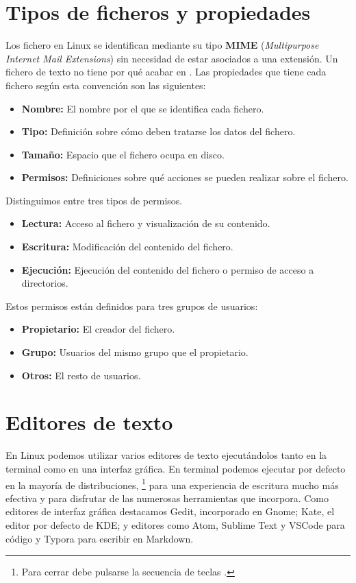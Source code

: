 \section{Tipos de ficheros y propiedades}

Los fichero en Linux se identifican mediante su tipo \textbf{MIME} (\textit{Multipurpose Internet Mail Extensions}) sin necesidad de estar asociados a una extensión.
Un fichero de texto no tiene por qué acabar en .
Las propiedades que tiene cada fichero según esta convención son las siguientes:

\begin{itemize}
	\item\textbf{Nombre:} El nombre por el que se identifica cada fichero.
	\item\textbf{Tipo:} Definición sobre cómo deben tratarse los datos del fichero.
	\item\textbf{Tamaño:} Espacio que el fichero ocupa en disco.
	\item\textbf{Permisos:} Definiciones sobre qué acciones se pueden realizar sobre el fichero.
\end{itemize}

Distinguimos entre tres tipos de permisos.

\begin{itemize}
	\item\textbf{Lectura:} Acceso al fichero y visualización de su contenido.
	\item\textbf{Escritura:} Modificación del contenido del fichero.
	\item\textbf{Ejecución:} Ejecución del contenido del fichero o permiso de acceso a directorios.
\end{itemize}

Estos permisos están definidos para tres grupos de usuarios:

\begin{itemize}
	\item\textbf{Propietario:} El creador del fichero.
	\item\textbf{Grupo:} Usuarios del mismo grupo que el propietario.
	\item\textbf{Otros:} El resto de usuarios.
\end{itemize}

\section{Editores de texto}

En Linux podemos utilizar varios editores de texto ejecutándolos tanto en la terminal como en una interfaz gráfica.
En terminal podemos ejecutar  por defecto en la mayoría de distribuciones, \footnote{Para cerrar  debe pulsarse la secuencia de teclas .} para una experiencia de escritura mucho más efectiva y  para disfrutar de las numerosas herramientas que incorpora.
Como editores de interfaz gráfica destacamos Gedit, incorporado en Gnome; Kate, el editor por defecto de KDE\@; y editores como Atom, Sublime Text y VSCode para código y Typora para escribir en Markdown.
